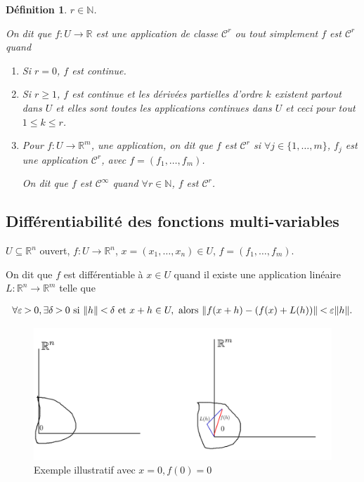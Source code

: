 \documentclass[french]{article}
\newtheorem{definition}{Définition}[section]
\newcommand{\lesss}{\rotatebox[origin=c]{90}{$\land$}}
\newcommand{\less}{\ \lesss\ }
\newcommand{\biggg}{\rotatebox[origin=c]{90}{$\lor$}}
\newcommand{\bg}{\ \biggg\ }
\begin{document}
\begin{definition}
  $r \in \mathbb{N}$.

  On dit que $f : U \to \mathbb{R}$ est une application de classe $\mathcal{C}^r$  ou tout simplement $f$ est $\mathcal{C}^r$ quand

  \begin{enumerate}
    \item Si $r=0$, $f$ est continue.
    \item Si $r \geq 1$, $f$ est continue et les dérivées partielles d'ordre $k$ existent partout dans $U$ et elles sont toutes les applications continues dans $U$ et ceci pour tout $ 1 \leq k \leq r$.
    \item Pour $f : U \to \mathbb{R}^m$, une application, on dit que $f$ est $\mathcal{C}^r$ si $\forall j \in \{ 1, \dots, m \} $, $f_j$ est une application $\mathcal{C}^r$, avec $f = (f_1, \dots, f_m)$.

    On dit que $f$ est $\mathcal{C}^\infty$ quand $\forall r \in \mathbb{N}$, $f$ est $\mathcal{C}^r$.
  \end{enumerate}
\end{definition}

\subsection{Différentiabilité des fonctions multi-variables}

$U \subseteq \mathbb{R}^n$ ouvert, $f : U \to \mathbb{R}^n$, $x=(x_1, \dots, x_n) \in U$, $f = (f_1, \dots, f_m)$.

On dit que $f$ est différentiable à $x \in U$ quand il existe une application linéaire $L : \mathbb{R}^n \to \mathbb{R}^m$ telle que

\begin{gather*}
  \forall \varepsilon \bg 0, \exists \delta  \bg 0 \text{ si } \Vert h \Vert \less \delta \text{ et } x+h \in U, \text{ alors } \Vert f(x+h) - (f(x)+L(h)) \Vert \less \varepsilon \Vert h \Vert .
\end{gather*}

\begin{figure}[h!]
  \centering
  \includegraphics[scale=0.3]{figures/diff.png}
  \caption{Exemple illustratif avec $x=0, f(0) = 0$}
  \label{}
\end{figure}
\end{document}

